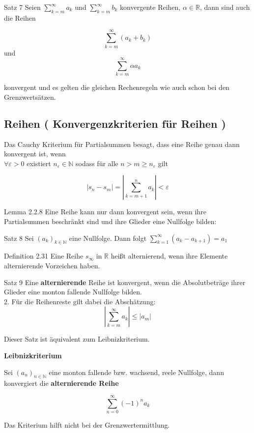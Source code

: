 \documentclass[headsepline,12pt,a4paper]{scrartcl}
\begin{document}
\item[Satz 7] 
Seien $\sum\limits_{k=m}^{\infty} a_k$ und $\sum\limits_{k=m}^{\infty} b_k$ konvergente Reihen, $\alpha \in \mathbb{R}$, dann sind auch die Reihen

$$ \sum\limits_{k=m}^{\infty} (a_k+b_k) $$ und  $$\sum\limits_{k=m}^{\infty} \alpha a_k$$

konvergent und es gelten die gleichen Rechenregeln wie auch schon bei den Grenzwertsätzen. \\

\newpage

\subsection*{Reihen ( Konvergenzkriterien für Reihen ) }

Das Cauchy Kriterium für Partialsummen besagt, dass eine Reihe genau dann konvergent ist, wenn \\

$\forall \varepsilon >0 $ existiert $ n_\varepsilon \in \mathbb{N} $ sodass für alle $n>m\geq  n_\varepsilon$ gilt 

$$ |s_n - s_m| = |\sum\limits_{k=m+1}^{n} a_k| < \varepsilon $$

\item[Lemma 2.2.8]
Eine Reihe kann nur dann konvergent sein, wenn ihre Partialsummen beschränkt sind und ihre Glieder eine Nullfolge bilden: \\

\item[Satz 8] 
Sei $(a_k)_{k \in \mathbb{N}}$ eine Nullfolge. Dann folgt $\sum\limits_{k=1}^{\infty} (a_k - a_{k+1})=a_1$

\item[Definition 2.31]
Eine Reihe $s_{\infty}$ in $\mathbb{R}$ heißt alternierend, wenn ihre Elemente alternierende Vorzeichen haben.

\item[Satz 9]
Eine \textbf{alternierende} Reihe ist konvergent, wenn die Absolutbeträge ihrer Glieder eine monton fallende Nullfolge bilden. \\

2. Für die Reihenreste gilt dabei die Abschätzung: \\
$$ |\sum\limits_{k=m}^{\infty} a_k| \leq |a_m|$$

Dieser Satz ist äquivalent zum Leibnizkriterium. \\

\item[\textbf{Leibnizkriterium}]

Sei $(a_n)_{n \in \mathbb{N}}$ eine monton fallende bzw. wachsend, reele Nullfolge, dann konvergiert die \textbf{alternierende Reihe}

$$ \sum\limits_{n=0}^{\infty} (-1)^n a_k$$

Das Kriterium hilft nicht bei der Grenzwertermittlung. \\
\end{document}
